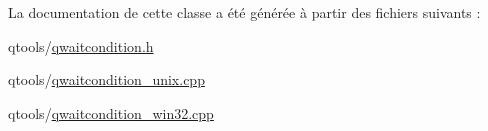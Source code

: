 La documentation de cette classe a été générée à partir des fichiers suivants \+:\begin{DoxyCompactItemize}
\item 
qtools/\hyperlink{qwaitcondition_8h}{qwaitcondition.\+h}\item 
qtools/\hyperlink{qwaitcondition__unix_8cpp}{qwaitcondition\+\_\+unix.\+cpp}\item 
qtools/\hyperlink{qwaitcondition__win32_8cpp}{qwaitcondition\+\_\+win32.\+cpp}\end{DoxyCompactItemize}
